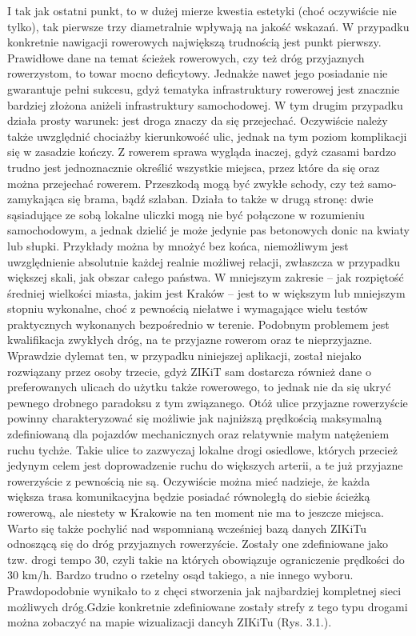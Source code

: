 I tak jak ostatni punkt, to w dużej mierze kwestia estetyki (choć oczywiście nie tylko), tak pierwsze trzy diametralnie wpływają na jakość wskazań. W przypadku konkretnie nawigacji rowerowych największą trudnością jest punkt pierwszy. Prawidłowe dane na temat ścieżek rowerowych, czy też dróg przyjaznych rowerzystom, to towar mocno deficytowy. Jednakże nawet jego posiadanie nie gwarantuje pełni sukcesu, gdyż tematyka infrastruktury rowerowej jest znacznie bardziej złożona aniżeli infrastruktury samochodowej. W tym drugim przypadku działa prosty warunek: jest droga znaczy da się przejechać. Oczywiście należy także uwzględnić chociażby kierunkowość ulic, jednak na tym poziom komplikacji się w zasadzie kończy. Z rowerem sprawa wygląda inaczej, gdyż czasami bardzo trudno jest jednoznacznie określić wszystkie miejsca, przez które da się oraz można przejechać rowerem. Przeszkodą mogą być zwykłe schody, czy też samo-zamykająca się brama, bądź szlaban. Działa to także w drugą stronę: dwie sąsiadujące ze sobą lokalne uliczki mogą nie być połączone w rozumieniu samochodowym, a jednak dzielić je może jedynie pas betonowych donic na kwiaty lub słupki. Przykłady można by mnożyć bez końca, niemożliwym jest uwzględnienie absolutnie każdej realnie możliwej relacji, zwłaszcza w przypadku większej skali, jak obszar całego państwa. W mniejszym zakresie – jak rozpiętość średniej wielkości miasta, jakim jest Kraków – jest to w większym lub mniejszym stopniu wykonalne, choć z pewnością niełatwe i wymagające wielu testów praktycznych wykonanych bezpośrednio w terenie. Podobnym problemem jest kwalifikacja zwykłych dróg, na te przyjazne rowerom oraz te nieprzyjazne. Wprawdzie dylemat ten, w przypadku niniejszej aplikacji, został niejako rozwiązany przez osoby trzecie, gdyż ZIKiT sam dostarcza również dane o preferowanych ulicach do użytku także rowerowego, to jednak nie da się ukryć pewnego drobnego paradoksu z tym związanego. Otóż ulice przyjazne rowerzyście powinny charakteryzować się możliwie jak najniższą prędkością maksymalną zdefiniowaną dla pojazdów mechanicznych oraz relatywnie małym natężeniem ruchu tychże. Takie ulice to zazwyczaj lokalne drogi osiedlowe, których przecież jedynym celem jest doprowadzenie ruchu do większych arterii, a te już przyjazne rowerzyście z pewnością nie są. Oczywiście można mieć nadzieje, że każda większa trasa komunikacyjna będzie posiadać równoległą do siebie ścieżką rowerową, ale niestety w Krakowie na ten moment nie ma to jeszcze miejsca.\newline
Warto się także pochylić nad wspomnianą wcześniej bazą danych ZIKiTu odnoszącą się do dróg przyjaznych rowerzyście. Zostały one zdefiniowane jako tzw. drogi tempo 30, czyli takie na których obowiązuje ograniczenie prędkości do 30 km/h. Bardzo trudno o rzetelny osąd takiego, a nie innego wyboru. Prawdopodobnie wynikało to z chęci stworzenia jak najbardziej kompletnej sieci możliwych dróg.Gdzie konkretnie zdefiniowane zostały strefy z tego typu drogami można zobaczyć na mapie wizualizacji dancyh ZIKiTu (Rys. 3.1.).\newline

